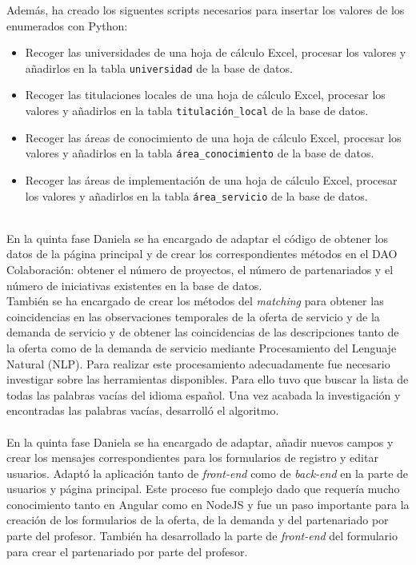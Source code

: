 \documentclass[11pt]{book}
\begin{document}
  Además, ha creado los siguentes scripts necesarios para insertar los valores de los enumerados con Python:
\begin{itemize} 
	\item Recoger las universidades de una hoja de cálculo Excel, procesar los valores y añadirlos en la tabla \texttt{universidad} de la base de datos.
	\item Recoger las titulaciones locales de una hoja de cálculo Excel, procesar los valores y añadirlos en la tabla \texttt{titulación\_local} de la base de datos.
	\item Recoger las áreas de conocimiento de una hoja de cálculo Excel, procesar los valores y añadirlos en la tabla \texttt{área\_conocimiento} de la base de datos.
	\item Recoger las áreas de implementación de una hoja de cálculo Excel, procesar los valores y añadirlos en la tabla \texttt{área\_servicio} de la base de datos.\\\\
\end{itemize}
En la quinta fase Daniela se ha encargado de adaptar el código de obtener los datos de la página principal y de crear los correspondientes métodos en el DAO Colaboración: obtener el número de proyectos, el número de partenariados y el número de iniciativas existentes en la base de datos.\\ 
También se ha encargado de crear los métodos del \emph{matching} para obtener las coincidencias en las observaciones temporales de la oferta de servicio y de la demanda de servicio y de obtener las coincidencias de las descripciones tanto de la oferta como de la demanda de servicio mediante Procesamiento del Lenguaje Natural (NLP). Para realizar este procesamiento adecuadamente fue necesario investigar sobre las herramientas disponibles. Para ello tuvo que buscar la lista de todas las palabras vacías del idioma español. Una vez acabada la investigación y encontradas las palabras vacías, desarrolló el algoritmo.\\\\
En la quinta fase Daniela se ha encargado de adaptar, añadir nuevos campos y crear los mensajes correspondientes para los formularios de registro y editar usuarios. Adaptó la aplicación tanto de \textit{front-end} como de \textit{back-end} en la parte de usuarios y página principal. Este proceso fue complejo dado que requería mucho conocimiento tanto en Angular como en NodeJS y fue un paso importante para la creación de los formularios de la oferta, de la demanda y del partenariado por parte del profesor. También ha desarrollado la parte de \textit{front-end} del formulario para crear el partenariado por parte del profesor.
\end{document}
